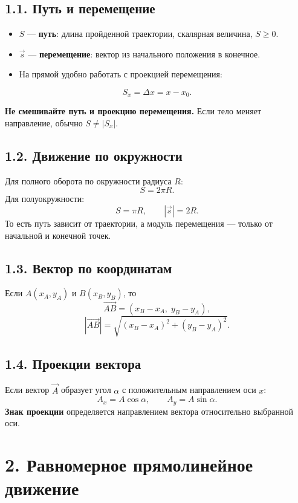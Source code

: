 \documentclass[a4paper,12pt]{article}
\newcommand{\key}[1]{\textbf{\color{darkaccent}#1}}
\newcommand{\warntext}[1]{\textbf{\color{warn}#1}}
\newcommand{\formula}[1]{\[\displaystyle #1\]}
\begin{document}
\subsection*{1.1. Путь и перемещение}
\begin{itemize}
\item $S$ --- \textbf{путь}: длина пройденной траектории, скалярная величина, $S\ge0$.
\item $\vec s$ --- \textbf{перемещение}: вектор из начального положения в конечное.
\item На прямой удобно работать с проекцией перемещения:
\end{itemize}
\formula{S_x=\Delta x=x-x_0.}

\warntext{Не смешивайте путь и проекцию перемещения.} Если тело меняет направление, обычно $S\neq|S_x|$.

\subsection*{1.2. Движение по окружности}
Для полного оборота по окружности радиуса $R$:
\formula{S=2\pi R.}
Для полуокружности:
\formula{S=\pi R, \qquad |\vec s|=2R.}
То есть путь зависит от траектории, а модуль перемещения --- только от начальной и конечной точек.

\subsection*{1.3. Вектор по координатам}
Если $A(x_A,y_A)$ и $B(x_B,y_B)$, то
\formula{\vec{AB}=(x_B-x_A,\;y_B-y_A),}
\formula{|\vec{AB}|=\sqrt{(x_B-x_A)^2+(y_B-y_A)^2}.}

\subsection*{1.4. Проекции вектора}
Если вектор $\vec A$ образует угол $\alpha$ с положительным направлением оси $x$:
\formula{A_x=A\cos\alpha, \qquad A_y=A\sin\alpha.}
\key{Знак проекции} определяется направлением вектора относительно выбранной оси.

\normalsize
\clearpage

\section*{2. Равномерное прямолинейное движение}
\small
\end{document}
